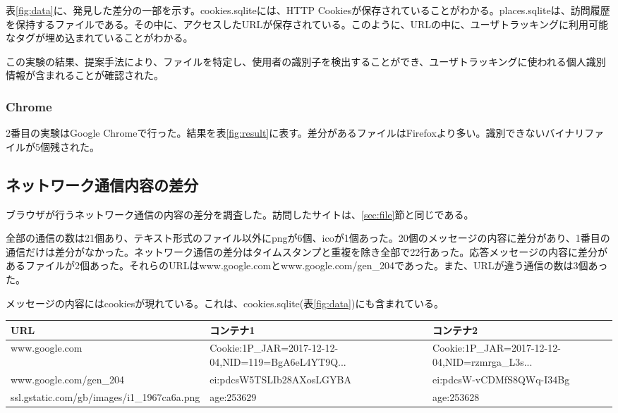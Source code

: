 \documentclass[a4paper,twocolumn,10pt]{jarticle}
\begin{document}
表\ref{fig:data}に、発見した差分の一部を示す。cookies.sqliteには、HTTP Cookiesが保存されていることがわかる。places.sqliteは、訪問履歴を保持するファイルである。その中に、アクセスしたURLが保存されている。このように、URLの中に、ユーザトラッキングに利用可能なタグが埋め込まれていることがわかる。

この実験の結果、提案手法により、ファイルを特定し、使用者の識別子を検出することができ、ユーザトラッキングに使われる個人識別情報が含まれることが確認された。

\subsubsection{Chrome}

2番目の実験はGoogle Chromeで行った。結果を表\ref{fig:result}に表す。差分があるファイルはFirefoxより多い。識別できないバイナリファイルが5個残された。

\label{sec:one}
\subsection{ネットワーク通信内容の差分}
ブラウザが行うネットワーク通信の内容の差分を調査した。訪問したサイトは、\ref{sec:file}節と同じである。

全部の通信の数は21個あり、テキスト形式のファイル以外にpngが6個、icoが1個あった。20個のメッセージの内容に差分があり、1番目の通信だけは差分がなかった。ネットワーク通信の差分はタイムスタンプと重複を除き全部で22行あった。応答メッセージの内容に差分があるファイルが2個あった。それらのURLはwww.google.comとwww.google.com/gen\_204であった。また、URLが違う通信の数は3個あった。

メッセージの内容にはcookiesが現れている。これは、cookies.sqlite(表\ref{fig:data})にも含まれている。
\begin{table*}[ht]
\caption{ネットワーク通信差分の例}
\centering

\begin{tabular}{ |l|p{4cm}|p{4cm}| }

 \hline
 \footnotesize{URL}　&\footnotesize{コンテナ1}　&\footnotesize{コンテナ2}\\
 \hline
 \footnotesize{www.google.com} & \footnotesize{Cookie:1P\_JAR=2017-12-12-04,NID=119=BgA6eL4YT9Q...} & \footnotesize{Cookie:1P\_JAR=2017-12-12-04,NID=rzmrga\_L3s...}\\
\hline
 \footnotesize{www.google.com/gen\_204} & \footnotesize{ei:pdcsW5TSLIb28AXosLGYBA} & \footnotesize{ei:pdcsW-vCDMfS8QWq-I34Bg}\\
\hline
 \footnotesize{ssl.gstatic.com/gb/images/i1\_1967ca6a.png} & \footnotesize{age:253629} & \footnotesize{age:253628}\\
 \hline

\end{tabular}
\label{fig:data}
\end{table*}
\end{document}
